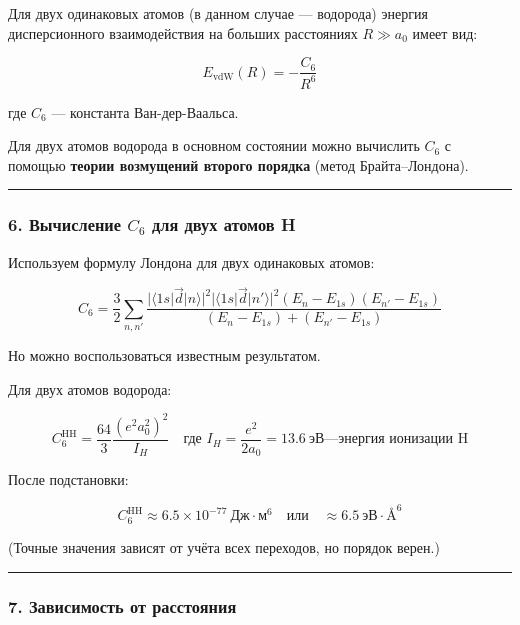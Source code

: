 \documentclass[11pt]{article}
\begin{document}
Для двух одинаковых атомов (в данном случае --- водорода) энергия
дисперсионного взаимодействия на больших расстояниях \(R \gg a_0\) имеет
вид:

\[
E_{\text{vdW}}(R) = -\frac{C_6}{R^6}
\]

где \(C_6\) --- константа Ван-дер-Ваальса.

Для двух атомов водорода в основном состоянии можно вычислить \(C_6\) с
помощью \textbf{теории возмущений второго порядка} (метод
Брайта--Лондона).

\begin{center}\rule{0.5\linewidth}{\linethickness}\end{center}

\subsubsection{6. Вычисление $C_6$ для двух атомов
H}\label{ux432ux44bux447ux438ux441ux43bux435ux43dux438ux435-c_6-ux434ux43bux44f-ux434ux432ux443ux445-ux430ux442ux43eux43cux43eux432-h}

Используем формулу Лондона для двух одинаковых атомов:

\[
C_6 = \frac{3}{2} \sum_{n,n'} \frac{|\langle 1s|\vec{d}|n \rangle|^2 |\langle 1s|\vec{d}|n' \rangle|^2 (E_n - E_{1s})(E_{n'} - E_{1s})}{(E_n - E_{1s}) + (E_{n'} - E_{1s})}
\]

Но можно воспользоваться известным результатом.

Для двух атомов водорода:

\[
C_6^{\text{HH}} = \frac{64}{3} \frac{(e^2 a_0^2)^2}{I_H}
\quad \text{где } I_H = \frac{e^2}{2a_0} = 13.6~\text{эВ} — \text{энергия ионизации H}
\]

После подстановки:

\[
C_6^{\text{HH}} \approx 6.5 \times 10^{-77}~\text{Дж} \cdot \text{м}^6 \quad \text{или} \quad \approx 6.5~\text{эВ} \cdot \text{Å}^6
\]

(Точные значения зависят от учёта всех переходов, но порядок верен.)

\begin{center}\rule{0.5\linewidth}{\linethickness}\end{center}

\subsubsection{7. Зависимость от
расстояния}\label{ux437ux430ux432ux438ux441ux438ux43cux43eux441ux442ux44c-ux43eux442-ux440ux430ux441ux441ux442ux43eux44fux43dux438ux44f}
\end{document}

